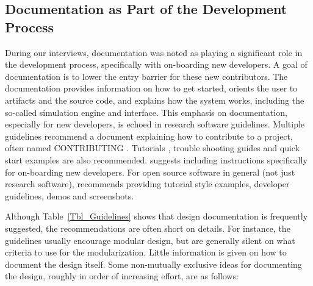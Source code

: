 \documentclass[final, 3p, times, authoryear]{elsarticle}
\begin{document}
\subsection{Documentation as Part of the Development Process}

During our interviews, documentation was noted as playing a significant role in
the development process, specifically with on-boarding new developers. A goal of
documentation is to lower the entry barrier for these new contributors. The
documentation provides information on how to get started, orients the user to
artifacts and the source code, and explains how the system works, including the
so-called simulation engine and interface.  This emphasis on documentation,
especially for new developers, is echoed in research software guidelines.
Multiple guidelines recommend a document explaining how to contribute to a
project, often named CONTRIBUTING \citep{Yo2021, BrettEtAl2021, WilsonEtAl2016,
ThielEtAl2020, vanGompelEtAl2016, OrvizEtAl2017, FLOSS2022, JimenezEtAl2017}.
Tutorials \citep{ThielEtAl2020}, trouble shooting guides \citep{OrvizEtAl2017,
SSI2022} and quick start examples \citep{ThielEtAl2020, vanGompelEtAl2016} are
also recommended.  \citet{SmithAndRoscoe2018} suggests including instructions
specifically for on-boarding new developers. For open source software in general
(not just research software), \citet{Fogel2005} recommends providing tutorial
style examples, developer guidelines, demos and screenshots.

Although Table~\ref{Tbl_Guidelines} shows that design documentation is
frequently suggested, the recommendations are often short on details. For
instance, the guidelines usually encourage modular design, but are generally
silent on what criteria to use for the modularization.  Little information is
given on how to document the design itself. Some non-mutually exclusive ideas
for documenting the design, roughly in order of increasing effort, are as
follows:
\end{document}
